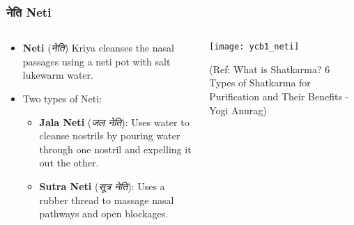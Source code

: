 \begin{frame}[fragile]\frametitle{नेति Neti}
\begin{columns}
    \begin{column}[T]{0.5\linewidth}
      \begin{itemize}
          \item \textbf{Neti} (\textit{नेति}) Kriya cleanses the nasal passages using a neti pot with salt lukewarm water.
          \item Two types of Neti:
            \begin{itemize}
              \item \textbf{Jala Neti} (\textit{जल नेति}): Uses water to cleanse nostrils by pouring water through one nostril and expelling it out the other.
              \item \textbf{Sutra Neti} (\textit{सूत्र नेति}): Uses a rubber thread to massage nasal pathways and open blockages.
            \end{itemize}
      \end{itemize}
    \end{column}
    \begin{column}[T]{0.5\linewidth}
        \begin{center}
        \texttt{[image: ycb1\_neti]}
		
		{\tiny (Ref: What is Shatkarma? 6 Types of Shatkarma for Purification and Their Benefits - Yogi Anurag)}	
        \end{center}	
    \end{column}
\end{columns}
\end{frame}


